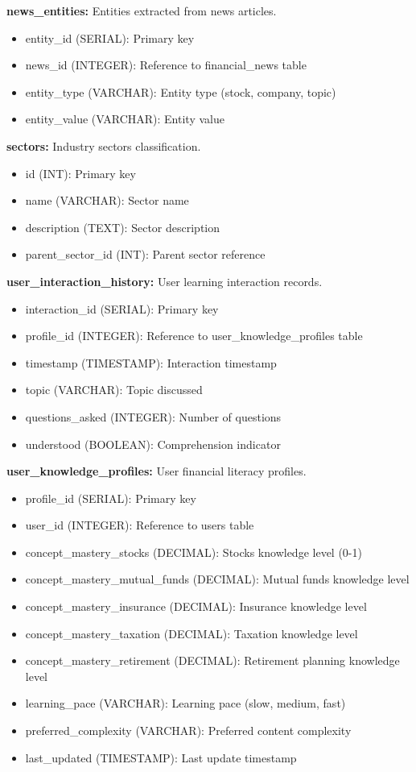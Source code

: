 \documentclass[12pt,a4paper]{report}
\begin{document}
\textbf{news\_entities:} Entities extracted from news articles.
\begin{itemize}
    \item entity\_id (SERIAL): Primary key
    \item news\_id (INTEGER): Reference to financial\_news table
    \item entity\_type (VARCHAR): Entity type (stock, company, topic)
    \item entity\_value (VARCHAR): Entity value
\end{itemize}

\textbf{sectors:} Industry sectors classification.
\begin{itemize}
    \item id (INT): Primary key
    \item name (VARCHAR): Sector name
    \item description (TEXT): Sector description
    \item parent\_sector\_id (INT): Parent sector reference
\end{itemize}

\textbf{user\_interaction\_history:} User learning interaction records.
\begin{itemize}
    \item interaction\_id (SERIAL): Primary key
    \item profile\_id (INTEGER): Reference to user\_knowledge\_profiles table
    \item timestamp (TIMESTAMP): Interaction timestamp
    \item topic (VARCHAR): Topic discussed
    \item questions\_asked (INTEGER): Number of questions
    \item understood (BOOLEAN): Comprehension indicator
\end{itemize}

\textbf{user\_knowledge\_profiles:} User financial literacy profiles.
\begin{itemize}
    \item profile\_id (SERIAL): Primary key
    \item user\_id (INTEGER): Reference to users table
    \item concept\_mastery\_stocks (DECIMAL): Stocks knowledge level (0-1)
    \item concept\_mastery\_mutual\_funds (DECIMAL): Mutual funds knowledge level
    \item concept\_mastery\_insurance (DECIMAL): Insurance knowledge level
    \item concept\_mastery\_taxation (DECIMAL): Taxation knowledge level
    \item concept\_mastery\_retirement (DECIMAL): Retirement planning knowledge level
    \item learning\_pace (VARCHAR): Learning pace (slow, medium, fast)
    \item preferred\_complexity (VARCHAR): Preferred content complexity
    \item last\_updated (TIMESTAMP): Last update timestamp
\end{itemize}
\end{document}
